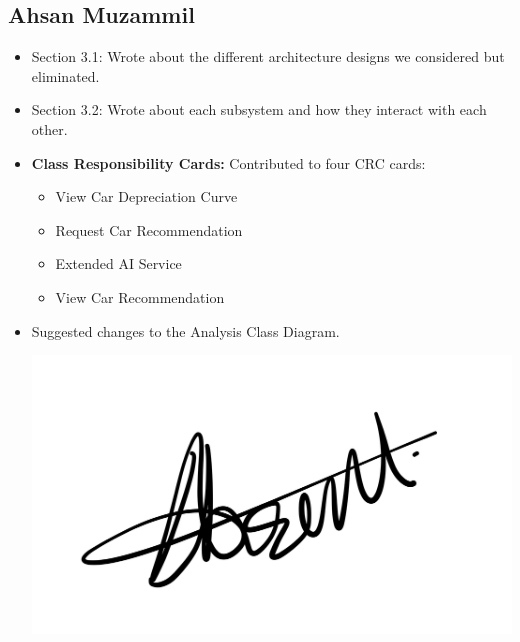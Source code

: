\documentclass[]{article}
\begin{document}
\subsection{Ahsan Muzammil}
\begin{itemize}
  \item Section 3.1: Wrote about the different architecture designs we considered but eliminated.
  \item Section 3.2: Wrote about each subsystem and how they interact with each other.
  \item \textbf{Class Responsibility Cards:} Contributed to four CRC cards:
        \begin{itemize}
          \item View Car Depreciation Curve
          \item Request Car Recommendation
          \item Extended AI Service
          \item View Car Recommendation
        \end{itemize}
  \item Suggested changes to the Analysis Class Diagram.
        \begin{center}
          \includegraphics[scale=0.1]{ahsan.jpeg}
        \end{center}
\end{itemize}
\end{document}
